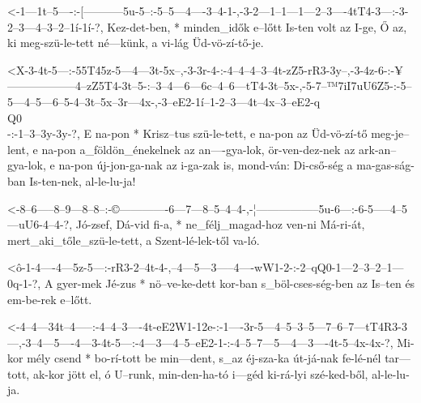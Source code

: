   {<-1---1t--5----:-[-----------5u-5--:-5--5---4----3--4-1-,-3-2---1--1---1---2--3----4tT4-3---:-3-2--3---4--3--2--1í-1í-?,}
  {  Kez-det-ben, * minden_idők e--lőtt Is-ten volt az I-ge, Ő az, ki meg-szü-le-tett né---künk, a vi-lág Üd-vö-zí-tő-je.}

  {<X-3-4t-5---:-55T45z-5---4---3t-5x--,-3-3r-4-:-4--4--4--3--4t-zZ5-rR3-3y--,-3-4z-6-:-¥------------------4--zZ5T4-3t--5-:--3--4---6---6c--4--6---tT4-3t--5x-,-5-7--™7iI7uU6Z5-:-5--5---4--5---6--5-4--3t--5x--3r---4x-,-3--eE2-1í--1-2--3---4t--4x--3--eE2-q\\Q0\\-:-1--3--3y-3y-?,}
  {   E na-pon * Krisz--tus szü-le-tett, e na-pon az Üd-vö-zí-tő meg-je--lent, e na-pon a_földön_énekelnek az an----gya-lok, ör-ven-dez-nek az ark-an--gya-lok, e na-pon          új-jon-ga-nak az i-ga-zak is, mond-ván: Di-cső-ség a ma-gas-ság-ban Is-ten-nek,      al-le-lu-ja!}



  {<-8--6-----8--9---8--8--:-©-------------6---7---8--5--4--4-,-¦-----------------5u-6---:-6-5-----4--5---uU6-4--4-?,}
  {  Jó-zsef, Dá-vid fi-a, * ne_félj_magad-hoz ven-ni Má-ri-át, mert_aki_tőle_szü-le-tett, a Szent-lé-lek-től va-ló.}


  {<ô-1-4----4---5z-5---:-rR3-2--4t-4-,--4---5---3-----4----wW1-2-:-2--qQ0-1---2--3--2--1---0q-1-?,}
  {   A gyer-mek Jé-zus * nö--ve-ke-dett kor-ban s_böl-cses-ség-ben az Is--ten és em-be-rek e--lőtt.}



  {<-4--4---34t--4-----:-4--4--3----4t-eE2W1-12e-:-1----3r-5---4--5--3--5---7--6--7---tT4R3-3---,-3--4---5----4---3-4t-5---:-4---3---4--5--eE2-1-:-4--5--7---5---4---3----4t-5--4x-4x-?,}
  {  Mi-kor mély csend * bo-rí-tott be min---dent, s_az éj-sza-ka út-já-nak fe-lé-nél tar---tott, ak-kor jött el, ó U--runk, min-den-ha-tó i---géd ki-rá-lyi szé-ked-ből, al-le-lu-ja.}



